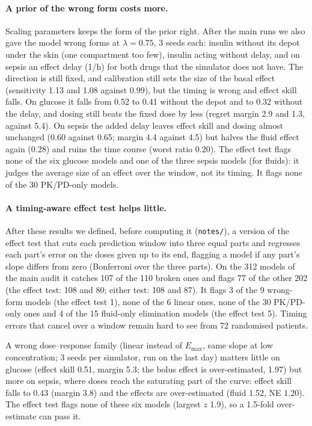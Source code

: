 \documentclass[letterpaper]{article}
\newcommand{\Emax}{E_{\max}}
\begin{document}
\paragraph{A prior of the wrong form costs more.} Scaling parameters keeps the form of the prior right. After the main runs we also gave the model wrong forms at $\lambda=0.75$, 3 seeds each: insulin without its depot under the skin (one compartment too few), insulin acting without delay, and on sepsis an effect delay (1/h) for both drugs that the simulator does not have. The direction is still fixed, and calibration still sets the size of the basal effect (sensitivity 1.13 and 1.08 against 0.99), but the timing is wrong and effect skill falls. On glucose it falls from 0.52 to 0.41 without the depot and to 0.32 without the delay, and dosing still beats the fixed dose by less (regret margin 2.9 and 1.3, against 5.4). On sepsis the added delay leaves effect skill and dosing almost unchanged (0.60 against 0.65; margin 4.4 against 4.5) but halves the fluid effect again (0.28) and ruins the time course (worst ratio 0.20). The effect test flags none of the six glucose models and one of the three sepsis models (for fluids): it judges the average size of an effect over the window, not its timing. It flags none of the 30 PK/PD-only models.

\paragraph{A timing-aware effect test helps little.} After these results we defined, before computing it (\texttt{notes/}), a version of the effect test that cuts each prediction window into three equal parts and regresses each part's error on the doses given up to its end, flagging a model if any part's slope differs from zero (Bonferroni over the three parts). On the 312 models of the main audit it catches 107 of the 110 broken ones and flags 77 of the other 202 (the effect test: 108 and 80; either test: 108 and 87). It flags 3 of the 9 wrong-form models (the effect test 1), none of the 6 linear ones, none of the 30 PK/PD-only ones and 4 of the 15 fluid-only elimination models (the effect test 5). Timing errors that cancel over a window remain hard to see from 72 randomised patients.

A wrong dose--response family (linear instead of $\Emax$, same slope at low concentration; 3 seeds per simulator, run on the last day) matters little on glucose (effect skill 0.51, margin 5.3; the bolus effect is over-estimated, 1.97) but more on sepsis, where doses reach the saturating part of the curve: effect skill falls to 0.43 (margin 3.8) and the effects are over-estimated (fluid 1.52, NE 1.20). The effect test flags none of these six models (largest $z$ 1.9), so a 1.5-fold over-estimate can pass it.
\end{document}
